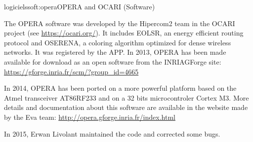\documentclass{ra2016}
\newcommand{\pascale} {\textbf{Pascale~Minet}}
\begin{document}
\begin{module}{logiciels}{soft:opera}{OPERA and OCARI (Software)} 

\begin{participants}
\end{participants}

The OPERA software was developed by the Hipercom2 team in the OCARI project (see \url{https://ocari.org/}). It includes EOLSR, an  energy efficient routing protocol and OSERENA, a coloring algorithm optimized for dense wireless networks. It was registered by the APP.
In 2013, OPERA has been made available for download as an open software from the INRIAGForge site: \url{https://gforge.inria.fr/scm/?group_id=4665}

In 2014, OPERA has been ported on a more powerful platform based on the Atmel transceiver AT86RF233 and on a 32 bits microcontroler Cortex M3.
More details and documentation about this software are available in the website made by the Eva team:
\url{http://opera.gforge.inria.fr/index.html}

In 2015, Erwan Livolant maintained the code and corrected some bugs.


\end{module}
\end{document}
